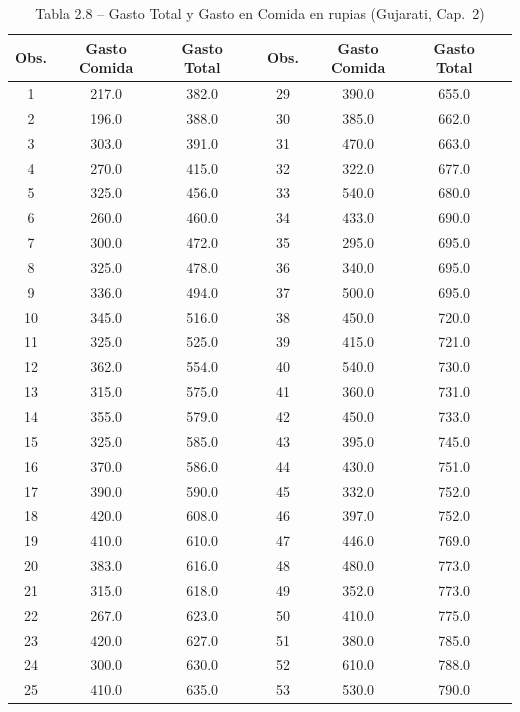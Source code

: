 \documentclass[12pt,a4paper]{article}
\begin{document}
\begin{table}[H]
\centering
\caption{Tabla 2.8 -- Gasto Total y Gasto en Comida en rupias (Gujarati, Cap.\ 2)}
\label{tab:datos}
\small
\begin{tabular}{cccc|cccc}
\toprule
\textbf{Obs.} & \textbf{Gasto Comida} & \textbf{Gasto Total} & \phantom{x}
 & \textbf{Obs.} & \textbf{Gasto Comida} & \textbf{Gasto Total} & \\
\midrule
 1 & 217.0 & 382.0 & &  29 & 390.0 & 655.0 & \\
 2 & 196.0 & 388.0 & &  30 & 385.0 & 662.0 & \\
 3 & 303.0 & 391.0 & &  31 & 470.0 & 663.0 & \\
 4 & 270.0 & 415.0 & &  32 & 322.0 & 677.0 & \\
 5 & 325.0 & 456.0 & &  33 & 540.0 & 680.0 & \\
 6 & 260.0 & 460.0 & &  34 & 433.0 & 690.0 & \\
 7 & 300.0 & 472.0 & &  35 & 295.0 & 695.0 & \\
 8 & 325.0 & 478.0 & &  36 & 340.0 & 695.0 & \\
 9 & 336.0 & 494.0 & &  37 & 500.0 & 695.0 & \\
10 & 345.0 & 516.0 & &  38 & 450.0 & 720.0 & \\
11 & 325.0 & 525.0 & &  39 & 415.0 & 721.0 & \\
12 & 362.0 & 554.0 & &  40 & 540.0 & 730.0 & \\
13 & 315.0 & 575.0 & &  41 & 360.0 & 731.0 & \\
14 & 355.0 & 579.0 & &  42 & 450.0 & 733.0 & \\
15 & 325.0 & 585.0 & &  43 & 395.0 & 745.0 & \\
16 & 370.0 & 586.0 & &  44 & 430.0 & 751.0 & \\
17 & 390.0 & 590.0 & &  45 & 332.0 & 752.0 & \\
18 & 420.0 & 608.0 & &  46 & 397.0 & 752.0 & \\
19 & 410.0 & 610.0 & &  47 & 446.0 & 769.0 & \\
20 & 383.0 & 616.0 & &  48 & 480.0 & 773.0 & \\
21 & 315.0 & 618.0 & &  49 & 352.0 & 773.0 & \\
22 & 267.0 & 623.0 & &  50 & 410.0 & 775.0 & \\
23 & 420.0 & 627.0 & &  51 & 380.0 & 785.0 & \\
24 & 300.0 & 630.0 & &  52 & 610.0 & 788.0 & \\
25 & 410.0 & 635.0 & &  53 & 530.0 & 790.0 & \\

\end{tabular}
\end{table}
\end{document}
